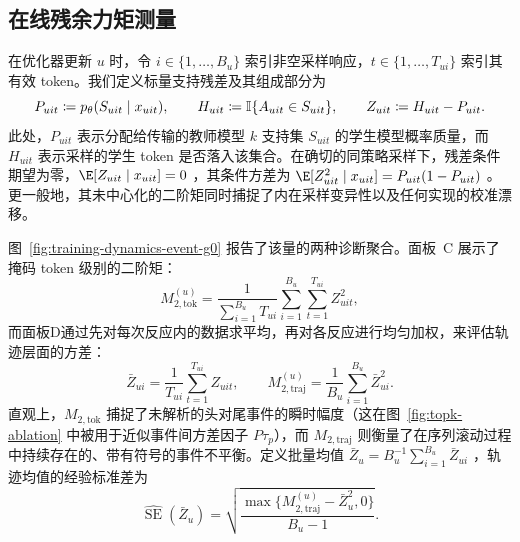 \subsection{在线残余力矩测量}
\label{app:online-residual-moments}

在优化器更新 $u$ 时，令 $i \in \{1, \dots, B_u\}$  索引非空采样响应，$t \in \{1, \dots, T_{ui}\}$  索引其有效 token。我们定义标量支持残差及其组成部分为
\begin{equation}
  P_{uit} \coloneqq p_\theta(S_{uit} \mid x_{uit}), \qquad
  H_{uit} \coloneqq \mathbb{I}\{A_{uit} \in S_{uit}\}, \qquad
  Z_{uit} \coloneqq H_{uit} - P_{uit}.
  \label{eq:online-support-residual}
\end{equation}
此处，$P_{uit}$ 表示分配给传输的教师模型 $k$ 支持集 $S_{uit}$ 的学生模型概率质量，而 $H_{uit}$ 表示采样的学生 token 是否落入该集合。在确切的同策略采样下，残差条件期望为零，$\E[Z_{uit} \mid x_{uit}] = 0$ ，其条件方差为 $\E[Z_{uit}^2 \mid x_{uit}] = P_{uit}(1 - P_{uit})$ 。更一般地，其未中心化的二阶矩同时捕捉了内在采样变异性以及任何实现的校准漂移。

图~\ref{fig:training-dynamics-event-g0} 报告了该量的两种诊断聚合。面板~C 展示了掩码 token 级别的二阶矩：
\begin{equation}
  M_{2,\mathrm{tok}}^{(u)} = \frac{1}{\sum_{i=1}^{B_u} T_{ui}} \sum_{i=1}^{B_u} \sum_{t=1}^{T_{ui}} Z_{uit}^2,
  \label{eq:online-token-m2}
\end{equation}
而面板D通过先对每次反应内的数据求平均，再对各反应进行均匀加权，来评估轨迹层面的方差：
\begin{equation}
  \bar{Z}_{ui} = \frac{1}{T_{ui}} \sum_{t=1}^{T_{ui}} Z_{uit}, \qquad
  M_{2,\mathrm{traj}}^{(u)} = \frac{1}{B_u} \sum_{i=1}^{B_u} \bar{Z}_{ui}^2.
  \label{eq:online-trajectory-m2}
\end{equation}
直观上，$M_{2,\mathrm{tok}}$ 捕捉了未解析的头对尾事件的瞬时幅度（这在图~\ref{fig:topk-ablation} 中被用于近似事件间方差因子 $P\tau_p$），而 $M_{2,\mathrm{traj}}$ 则衡量了在序列滚动过程中持续存在的、带有符号的事件不平衡。定义批量均值 $\bar{Z}_u = B_u^{-1} \sum_{i=1}^{B_u} \bar{Z}_{ui}$ ，轨迹均值的经验标准差为
\begin{equation}
  \widehat{\operatorname{SE}}(\bar{Z}_u) = \sqrt{\frac{\max\{M_{2,\mathrm{traj}}^{(u)} - \bar{Z}_u^2, 0\}}{B_u - 1}}.
  \label{eq:online-trajectory-se}
\end{equation}

